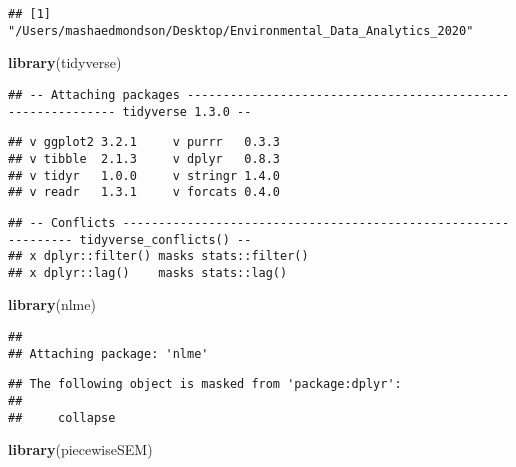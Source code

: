\documentclass[]{article}
\newenvironment{Shaded}{\begin{snugshade}}{\end{snugshade}}
\newcommand{\CommentTok}[1]{\textcolor[rgb]{0.56,0.35,0.01}{\textit{#1}}}
\newcommand{\KeywordTok}[1]{\textcolor[rgb]{0.13,0.29,0.53}{\textbf{#1}}}
\newcommand{\NormalTok}[1]{#1}
\begin{document}
\begin{Shaded}
\end{Shaded}

\begin{verbatim}
## [1] "/Users/mashaedmondson/Desktop/Environmental_Data_Analytics_2020"
\end{verbatim}

\begin{Shaded}
\begin{Highlighting}[]
\KeywordTok{library}\NormalTok{(tidyverse)}
\end{Highlighting}
\end{Shaded}

\begin{verbatim}
## -- Attaching packages ------------------------------------------------------------ tidyverse 1.3.0 --
\end{verbatim}

\begin{verbatim}
## v ggplot2 3.2.1     v purrr   0.3.3
## v tibble  2.1.3     v dplyr   0.8.3
## v tidyr   1.0.0     v stringr 1.4.0
## v readr   1.3.1     v forcats 0.4.0
\end{verbatim}

\begin{verbatim}
## -- Conflicts --------------------------------------------------------------- tidyverse_conflicts() --
## x dplyr::filter() masks stats::filter()
## x dplyr::lag()    masks stats::lag()
\end{verbatim}

\begin{Shaded}
\begin{Highlighting}[]
\KeywordTok{library}\NormalTok{(nlme)}
\end{Highlighting}
\end{Shaded}

\begin{verbatim}
## 
## Attaching package: 'nlme'
\end{verbatim}

\begin{verbatim}
## The following object is masked from 'package:dplyr':
## 
##     collapse
\end{verbatim}

\begin{Shaded}
\begin{Highlighting}[]
\KeywordTok{library}\NormalTok{(piecewiseSEM)}
\end{Highlighting}
\end{Shaded}
\end{document}
